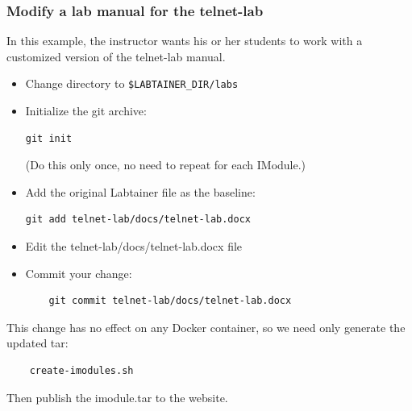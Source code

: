 \documentclass[12pt]{article}
\begin{document}
\subsubsection {Modify a lab manual for the telnet-lab}
In this example, the instructor wants his or her students to work with a customized version
of the telnet-lab manual.  
\begin{itemize}
\item Change directory to {\tt \$LABTAINER\_DIR/labs}
\item Initialize the git archive: 
\begin{verbatim}
git init  
\end{verbatim}
\noindent (Do this only once, no need to repeat for each IModule.)
\item Add the original Labtainer file as the baseline: 

\begin{verbatim}
git add telnet-lab/docs/telnet-lab.docx
\end{verbatim}
\item Edit the telnet-lab/docs/telnet-lab.docx file
\item Commit your change: 
\begin{verbatim}
    git commit telnet-lab/docs/telnet-lab.docx
\end{verbatim}
\end{itemize}

This change has no effect on any Docker container, so we need only generate the 
updated tar:
\begin{verbatim}
    create-imodules.sh
\end{verbatim}

\noindent Then publish the imodule.tar to the website.
\end{document}
